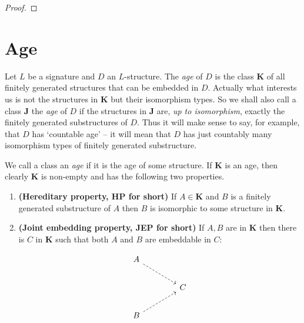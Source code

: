 \begin{proof}

\end{proof}









\section{Age}

Let \( L \) be a signature and \( D \) an \( L \)-structure. The \emph{age} of \( D \) is the class \( \mathbf{K} \) of all finitely generated structures that can be embedded in \( D \). Actually what interests us is not the structures in \( \mathbf{K} \) but their isomorphism types. So we shall also call a class \( \mathbf{J} \) the \emph{age} of \( D \) if the structures in \( \mathbf{J} \) are, \emph{up to isomorphism}, exactly the finitely generated substructures of \( D \). Thus it will make sense to say, for example, that \( D \) has ‘countable age’ -- it will mean that \( D \) has just countably many isomorphism types of finitely generated substructure.

We call a class an \emph{age} if it is the age of some structure. If \( \mathbf{K} \) is an age, then clearly \( \mathbf{K} \) is non-empty and has the following two properties.

\begin{enumerate}
    \item[(1.1)] \textbf{(Hereditary property, HP for short)} If \( A \in \mathbf{K} \) and \( B \) is a finitely generated substructure of \( A \) then \( B \) is isomorphic to some structure in \( \mathbf{K} \).

    \item[(1.2)] \textbf{(Joint embedding property, JEP for short)} If \( A, B \) are in \( \mathbf{K} \) then there is \( C \) in \( \mathbf{K} \) such that both \( A \) and \( B \) are embeddable in \( C \):

          \[
              \begin{tikzcd}[column sep=2em, row sep=2em]
                  A \ar[dashed, drr] & & \\
                  & & C \\
                  B \ar[dashed, urr] & &
              \end{tikzcd}
          \]
\end{enumerate}



